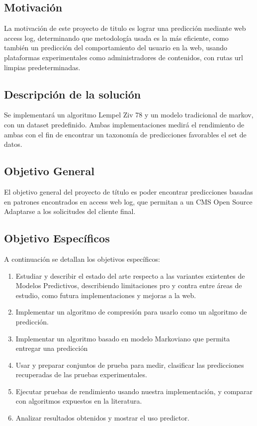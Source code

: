 \documentclass{udparticle}
\begin{document}
 




\subsection{Motivación}

La motivación de este proyecto de titulo es lograr una predicción mediante web access log, determinando que metodología usada es la más eficiente,
como también un predicción del comportamiento del usuario en la web, 
usando plataformas experimentales como administradores de contenidos, con rutas url limpias predeterminadas.
 
 
\newpage 
\subsection{Descripción de la solución }
 
 Se implementará un algoritmo Lempel Ziv 78 y un modelo tradicional de markov, con un dataset predefinido.
 Ambas implementaciones medirá el rendimiento de ambas con el fin de encontrar un taxonomía de predicciones favorables
 el set de datos.
 



\subsection{Objetivo General}
 
 El objetivo general del proyecto de título es poder encontrar predicciones basadas en patrones encontrados en access web log, que permitan
 a un CMS Open Source Adaptarse a los solicitudes del cliente final.
 
\subsection{Objetivo  Específicos }
 
 A continuación se detallan los objetivos específicos:
 
\begin{enumerate}
	\item Estudiar y describir el estado del arte respecto a las variantes existentes de Modelos Predictivos, describiendo limitaciones pro y contra entre áreas de estudio, como futura implementaciones y mejoras a la web.
	\item Implementar un algoritmo de compresión para usarlo como un algoritmo de predicción.
	\item Implementar un algoritmo basado en modelo Markoviano que permita entregar una predicción
	\item Usar y preparar conjuntos de prueba para medir, clasificar las predicciones recuperadas de las pruebas experimentales.
	\item Ejecutar pruebas de rendimiento usando nuestra implementación, y comparar con algoritmos expuestos en la literatura.
	\item Analizar resultados obtenidos y mostrar el uso predictor.

\end{enumerate}
\end{document}
